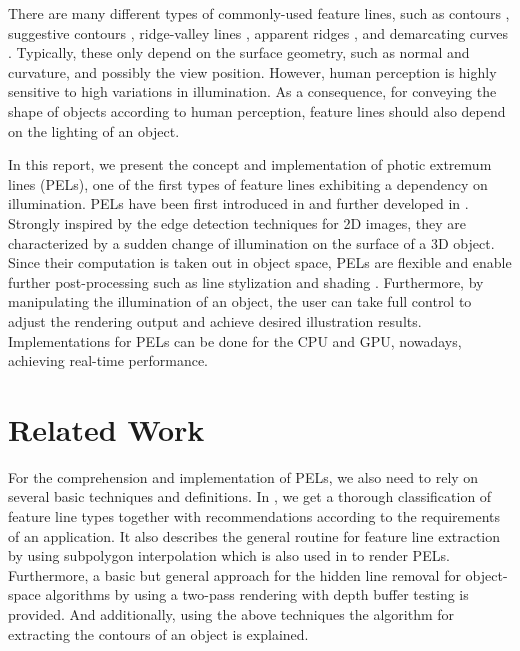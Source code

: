 \documentclass[9pt,fleqn,twoside,twocolumn]{stdglobal}
\begin{document}
  There are many different types of commonly-used feature lines, such as contours \autocite{isenberg2003}, suggestive contours \autocite{decarlo2003}, ridge-valley lines \autocite{ohtake2004}, apparent ridges \autocite{judd2007}, and demarcating curves \autocite{kolomenkin2008}.
  Typically, these only depend on the surface geometry, such as normal and curvature, and possibly the view position.
  However, human perception is highly sensitive to high variations in illumination.
  As a consequence, for conveying the shape of objects according to human perception, feature lines should also depend on the lighting of an object.
  \autocite{xie2007,zhang2011}

  In this report, we present the concept and implementation of photic extremum lines (PELs), one of the first types of feature lines exhibiting a dependency on illumination.
  PELs have been first introduced in \textcite{xie2007} and further developed in \textcite{zhang2010}.
  Strongly inspired by the edge detection techniques for 2D images, they are characterized by a sudden change of illumination on the surface of a 3D object.
  Since their computation is taken out in object space, PELs are flexible and enable further post-processing such as line stylization and shading \autocite{isenberg2003}.
  Furthermore, by manipulating the illumination of an object, the user can take full control to adjust the rendering output and achieve desired illustration results.
  Implementations for PELs can be done for the CPU and GPU, nowadays, achieving real-time performance.
  \autocite{xie2007,zhang2010}

\section{Related Work}
  For the comprehension and implementation of PELs, we also need to rely on several basic techniques and definitions.
  In \textcite{isenberg2003}, we get a thorough classification of feature line types together with recommendations according to the requirements of an application.
  It also describes the general routine for feature line extraction by using subpolygon interpolation which is also used in \textcite{zhang2010} to render PELs.
  Furthermore, a basic but general approach for the hidden line removal for object-space algorithms by using a two-pass rendering with depth buffer testing is provided.
  And additionally, using the above techniques the algorithm for extracting the contours of an object is explained.
  \autocite{isenberg2003}
\end{document}
